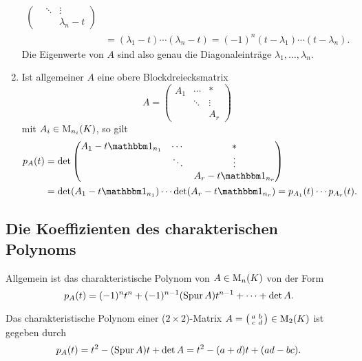 \begin{example}
\begin{enumerate}
\begin{align*}
\begin{pmatrix}
                            & \ddots  & \vdots        \\
                            &         & \lambda_n - t
            \end{pmatrix}
        \\
        &=  (\lambda_1 - t) \dotsm (\lambda_n - t)
         =  (-1)^n (t - \lambda_1) \dotsm (t - \lambda_n).
      \end{align*}
      Die Eigenwerte von $A$ sind also genau die Diagonaleinträge $\lambda_1, \dotsc, \lambda_n$.
    \item
      Ist allgemeiner $A$ eine obere Blockdreiecksmatrix
      \[
          A
        = \begin{pmatrix}
            A_1 & \cdots  & *       \\
                & \ddots  & \vdots  \\
                &         & A_r
          \end{pmatrix}
      \]
      mit $A_i \in \operatorname{M}_{n_i}(K)$, so gilt
      \begin{align*}
            \charpol{A}(t)
        &=  \det
            \begin{pmatrix}
              A_1 - t \Id_{n_1} & \cdots  & *                 \\
                                & \ddots  & \vdots            \\
                                &         & A_r - t \Id_{n_r}
            \end{pmatrix}
        \\
        &=  \det (A_1 - t \Id_{n_1}) \dotsm \det(A_r - t \Id_{n_r})
         =  \charpol{A_1}(t) \dotsm \charpol{A_r}(t).
      \end{align*}
  \end{enumerate}
\end{example}



\subsection*{Die Koeffizienten des charakterischen Polynoms}

Allgemein ist das charakteristische Polynom von $A \in \operatorname{M}_{n}(K)$ von der Form
\[
    p_{A}(t)
  = (-1)^n t^n + (-1)^{n-1} (\operatorname{Spur} A) t^{n-1} + \dotsb + \det A.
\]
\begin{example}
  Das charakteristische Polynom einer ($2 \times 2$)-Matrix $A = \begin{psmallmatrix} a & b \\ c & d \end{psmallmatrix} \in \operatorname{M}_{2}(K)$ ist gegeben durch
  \[
      p_{A}(t)
    = t^2 - (\operatorname{Spur} A) t + \det A
    = t^2 - (a + d) t + (ad - bc).
  \]
\end{example}





